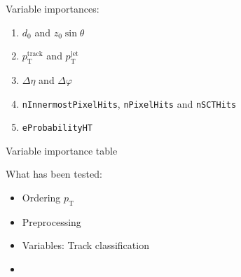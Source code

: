 Variable importances:
\begin{enumerate}
\item $d_0$ and $z_0 \sin\theta$
\item $p_\text{T}^\text{track}$ and $p_\text{T}^\text{jet}$
\item $\Delta \eta$ and $\Delta \varphi$
\item \texttt{nInnermostPixelHits}, \texttt{nPixelHits} and \texttt{nSCTHits}
\item \texttt{eProbabilityHT}
\end{enumerate}

\begin{table}[ht]
  \centering
  {\small}
  \caption{Variable importance table}
\end{table}





What has been tested:
\begin{itemize}
\item Ordering $p_\text{T}$
\item Preprocessing
\item Variables: Track classification
\item
\end{itemize}

